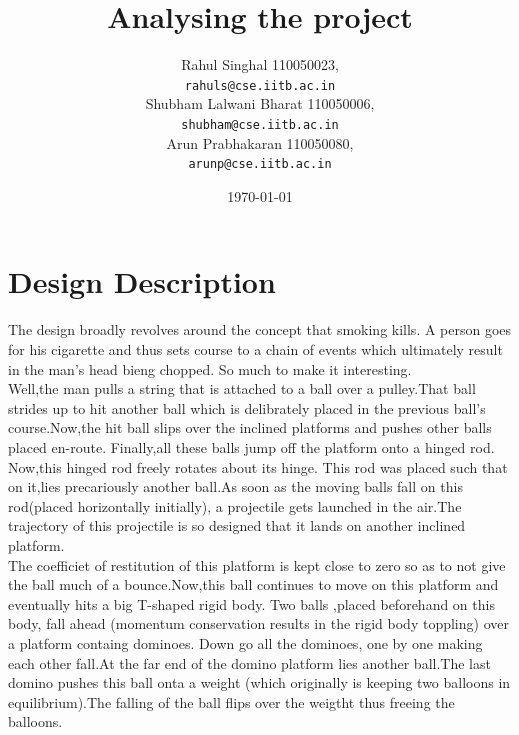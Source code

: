 \documentclass[11pt]{article}
\begin{document}
\title{Analysing the project}

\author{Rahul Singhal 110050023,\\
	\texttt{rahuls@cse.iitb.ac.in}\\
	Shubham Lalwani Bharat 110050006,\\
	\texttt{shubham@cse.iitb.ac.in}\\
	Arun Prabhakaran 110050080,\\
	\texttt{arunp@cse.iitb.ac.in}}

\date{\today}

\maketitle

\section{Design Description}

The design broadly revolves around the concept that smoking kills.
A person goes for his cigarette and thus sets course to a chain of events which ultimately result in the man's head bieng chopped.
So much to make it interesting.\\

Well,the man pulls a string that is attached to a ball over a pulley.That ball strides up to hit another ball which is delibrately
placed in the previous ball's course.Now,the hit ball slips over the inclined platforms and pushes other balls placed en-route.
Finally,all these balls jump off the platform onto a hinged rod. Now,this hinged rod freely rotates about its hinge.
This rod was placed such that on it,lies precariously another ball.As soon as the moving balls fall on this rod(placed horizontally initially),
a projectile gets launched in the air.The trajectory of this projectile is so designed that it lands on another inclined platform.\\

The coefficiet of restitution of this platform is kept close to zero so as to not give the ball much  of a bounce.Now,this ball
continues to move on this platform and eventually hits a big T-shaped rigid body. Two balls ,placed beforehand on this body,
fall ahead (momentum conservation results in the rigid body toppling) over a platform containg dominoes. Down go all the dominoes,
one by one making each other fall.At the far end of the domino platform lies another ball.The last domino pushes this ball onta a weight 
(which originally is keeping two balloons in equilibrium).The falling of the ball flips over the weigtht thus freeing the balloons.\\
\end{document}
